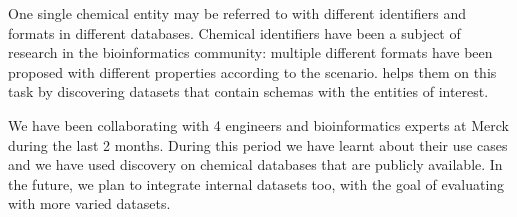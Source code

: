  One single chemical entity may be referred to with
different identifiers and formats in different databases. Chemical identifiers
have been a subject of research in the bioinformatics community: multiple
different formats have been proposed with different properties according to the
scenario. \dcv helps them on this task by discovering datasets that contain
schemas with the entities of interest.

We have been collaborating with 4 engineers and bioinformatics experts at Merck
during the last 2 months. During this period we have learnt about their use
cases and we have used discovery on chemical databases that are publicly
available. In the future, we plan to integrate internal datasets too, with the
goal of evaluating \dcv with more varied datasets.

